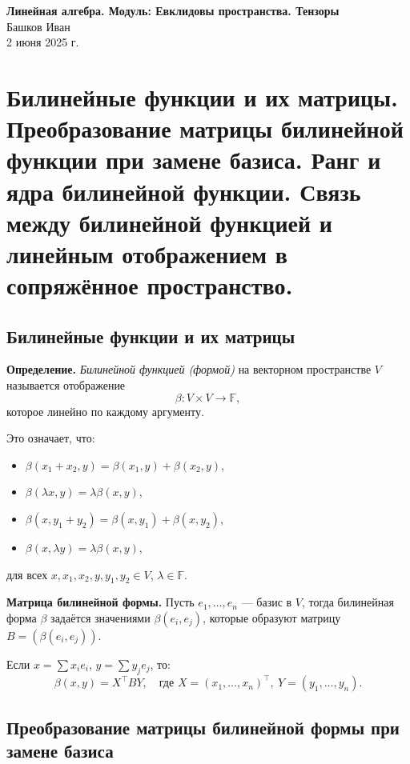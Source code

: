 \documentclass[12pt]{article}
\begin{document}
\begin{center}
    {\LARGE \textbf{Линейная алгебра. Модуль: Евклидовы пространства. Тензоры}}\\
    \vspace{0.3em}
    Башков Иван\\
    \vspace{0.3em}
    2 июня 2025 г.
\end{center}

\section{Билинейные функции и их матрицы. Преобразование матрицы билинейной функции при замене базиса. Ранг и ядра билинейной функции. Связь между билинейной функцией и линейным отображением в сопряжённое пространство.}

\subsection{Билинейные функции и их матрицы}

\textbf{Определение.} \textit{Билинейной функцией (формой)} на векторном пространстве $V$ называется отображение 
\[
\beta: V \times V \to \mathbb{F},
\]
которое линейно по каждому аргументу.

Это означает, что:
\begin{itemize}
    \item $\beta(x_1 + x_2, y) = \beta(x_1, y) + \beta(x_2, y)$,
    \item $\beta(\lambda x, y) = \lambda \beta(x, y)$,
    \item $\beta(x, y_1 + y_2) = \beta(x, y_1) + \beta(x, y_2)$,
    \item $\beta(x, \lambda y) = \lambda \beta(x, y)$,
\end{itemize}
для всех $x, x_1, x_2, y, y_1, y_2 \in V$, $\lambda \in \mathbb{F}$.

\vspace{0.5em}
\textbf{Матрица билинейной формы.} Пусть $e_1, \dots, e_n$ — базис в $V$, тогда билинейная форма $\beta$ задаётся значениями $\beta(e_i, e_j)$, которые образуют матрицу $B = (\beta(e_i, e_j))$.

Если $x = \sum x_i e_i$, $y = \sum y_j e_j$, то:
\[
\beta(x, y) = X^\top B Y, \quad \text{где } X = (x_1, \dots, x_n)^\top,\ Y = (y_1, \dots, y_n).
\]

\subsection{Преобразование матрицы билинейной формы при замене базиса}
\end{document}
